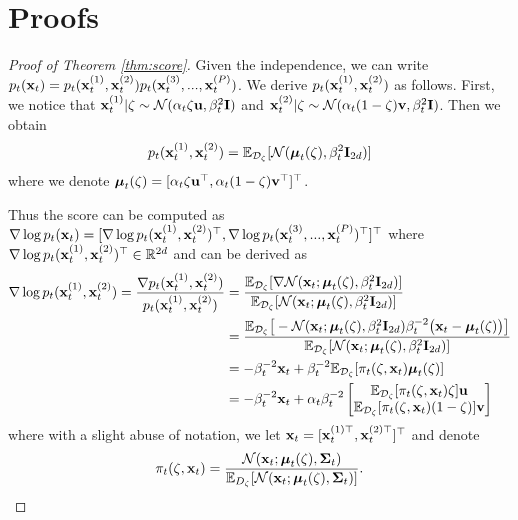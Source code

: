 \section{Proofs}


\begin{proof}[Proof of Theorem \ref{thm:score}]
Given the independence, we can write $p_t({\mathbf{x}}_t) = p_t({\mathbf{x}}_t^{(1)}, {\mathbf{x}}_t^{(2)}) p_t({\mathbf{x}}_t^{(3)}, ..., {\mathbf{x}}_t^{(P)})$. We derive $p_t({\mathbf{x}}_t^{(1)}, {\mathbf{x}}_t^{(2)})$ as follows. First, we notice that ${\mathbf{x}}_t^{(1)} | \zeta \sim {\mathcal{N}}(\alpha_t \zeta {\mathbf u}, \beta_t^2 {\mathbf{I}})$ and ${\mathbf{x}}_t^{(2)} |  \zeta \sim {\mathcal{N}}(\alpha_t  (1-\zeta) {\mathbf v}, \beta_t^2 {\mathbf{I}})$. Then we obtain 
\begin{align*}
    p_t({\mathbf{x}}_t^{(1)}, {\mathbf{x}}_t^{(2)}) = {\mathbb{E}}_{{\mathcal{D}}_\zeta} [ {\mathcal{N}}( {\boldsymbol{\mu}}_t(\zeta), \beta_t^2 {\mathbf{I}}_{2d} ) ]
\end{align*}
where we denote ${\boldsymbol{\mu}}_t(\zeta) = [\alpha_t  \zeta {\mathbf u}^\top, \alpha_t  (1- \zeta) {\mathbf v}^\top ]^\top$. 

Thus the score can be computed as $\nabla \log p_t({\mathbf{x}}_t) = [\nabla \log p_t({\mathbf{x}}_t^{(1)}, {\mathbf{x}}_t^{(2)})^\top, \nabla \log p_t({\mathbf{x}}_t^{(3)}, ..., {\mathbf{x}}_t^{(P)})^\top]^\top$ where $\nabla \log p_t({\mathbf{x}}_t^{(1)}, {\mathbf{x}}_t^{(2)})^\top \in {\mathbb{R}}^{2d}$ and can be derived as 
\begin{align*}
    \nabla \log p_t({\mathbf{x}}_t^{(1)}, {\mathbf{x}}_t^{(2)}) = \frac{\nabla p_t({\mathbf{x}}_t^{(1)}, {\mathbf{x}}_t^{(2)})}{p_t({\mathbf{x}}_t^{(1)}, {\mathbf{x}}_t^{(2)})} &= \frac{{\mathbb{E}}_{{\mathcal{D}}_\zeta} [ \nabla {\mathcal{N}}( {\mathbf{x}}_t; {\boldsymbol{\mu}}_t(\zeta), \beta_t^2 {\mathbf{I}}_{2d}) ]}{{\mathbb{E}}_{{\mathcal{D}}_\zeta} [ {\mathcal{N}}( {\mathbf{x}}_t;{\boldsymbol{\mu}}_t(\zeta), \beta_t^2 {\mathbf{I}}_{2d}) ]} \\
    &= \frac{{\mathbb{E}}_{{\mathcal{D}}_\zeta} \big[ -{\mathcal{N}}({\mathbf{x}}_t; {\boldsymbol{\mu}}_t(\zeta), \beta_t^2 {\mathbf{I}}_{2d})  \beta_t^{-2} \big(  {\mathbf{x}}_t - {\boldsymbol{\mu}}_t(\zeta) \big)  \big]}{{\mathbb{E}}_{{\mathcal{D}}_\zeta} [ {\mathcal{N}}( {\mathbf{x}}_t; {\boldsymbol{\mu}}_t(\zeta), \beta_t^2 {\mathbf{I}}_{2d}) ]} \\
    &= - \beta_t^{-2} {\mathbf{x}}_t + \beta_t^{-2} {\mathbb{E}}_{{\mathcal{D}}_\zeta} [  \pi_t(\zeta, {\mathbf{x}}_t) {\boldsymbol{\mu}}_t(\zeta)  ] \\
    &= - \beta_t^{-2} {\mathbf{x}}_t + \alpha_t \beta_t^{-2} \begin{bmatrix}
        {\mathbb{E}}_{{\mathcal{D}}_\zeta} [\pi_t(\zeta, {\mathbf{x}}_t) \zeta  ] {\mathbf u} \\
        {\mathbb{E}}_{{\mathcal{D}}_\zeta} [\pi_t(\zeta, {\mathbf{x}}_t) (1-\zeta) ] {\mathbf v} 
    \end{bmatrix} 
\end{align*}
where with a slight abuse of notation, we let ${\mathbf{x}}_t = [{\mathbf{x}}_t^{(1)\top}, {\mathbf{x}}_t^{(2)\top}]^\top$ and denote
\begin{equation*}
    \pi_t(\zeta, {\mathbf{x}}_t) = \frac{{\mathcal{N}}({\mathbf{x}}_t; {\boldsymbol{\mu}}_t( \zeta), {\boldsymbol{\Sigma}}_t)}{{\mathbb{E}}_{D_\zeta} [{\mathcal{N}}({\mathbf{x}}_t; {\boldsymbol{\mu}}_t( \zeta), {\boldsymbol{\Sigma}}_t)]}.
\end{equation*}
\end{proof}



